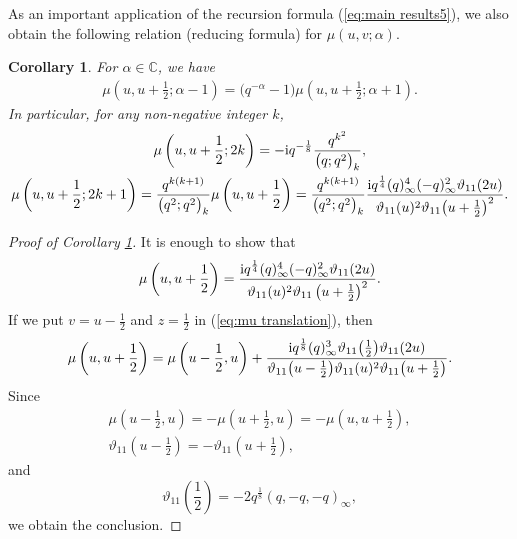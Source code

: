 \documentclass[pdftex]{sigma}
\numberwithin{equation}{section}
\newtheorem{cor}[thm]{Corollary}
\theoremstyle{definition}
\newcommand{\Cz}{\mathbb{C}}
\begin{document}
As an important application of the recursion formula (\ref{eq:main results5}), we also obtain the following relation (reducing formula) for $\mu(u,v;\alpha)$.
\begin{cor}
\label{cor:mu a reduction}
For $\alpha\in\Cz$, we have
\begin{gather}
\label{eq:mu a reduction}
\mu\left(u,u+\frac{1}{2};\alpha-1\right)=\big(q^{-\alpha}-1\big)\mu\left(u,u+\frac{1}{2};\alpha+1\right).
\end{gather}
In particular, for any non-negative integer $k$,
\begin{gather*}
\mu\left(u,u+\frac{1}{2};2k\right)
 =
 -{\rm i}q^{-\frac{1}{8}}\frac{q^{k^2}}{\big(q;q^2\big)_{k}}, \\
\mu\left(u,u+\frac{1}{2};2k+1\right)
 =
 \frac{q^{k(k+1)}}{\big(q^2;q^2\big)_{k}}\mu\left(u,u+\frac{1}{2}\right)
 =
 \frac{q^{k(k+1)}}{\big(q^2;q^2\big)_{k}}\frac{{\rm i}q^{\frac{1}{4}}(q)_{\infty }^{4}(-q)_{\infty }^{2}\vartheta_{11}(2u)}{\vartheta_{11}(u)^{2}\vartheta_{11}\big(u+\frac{1}{2}\big)^{2}}.
\end{gather*}
\end{cor}

\begin{proof}[Proof of Corollary \ref{cor:mu a reduction}]
It is enough to show that
\begin{gather*}
\mu\left(u,u+\frac{1}{2}\right)
 =
 \frac{{\rm i}q^{\frac{1}{4}}(q)_{\infty }^{4}(-q)_{\infty }^{2}\vartheta_{11}(2u)}{\vartheta_{11}(u)^{2}\vartheta_{11}\left(u+\frac{1}{2}\right)^{2}}.
\end{gather*}
If we put $v=u-\frac{1}{2}$ and $z=\frac{1}{2}$ in (\ref{eq:mu translation}), then
\begin{gather*}
\mu\left(u,u+\frac{1}{2}\right)
 =
 \mu\left(u-\frac{1}{2},u\right)
 +\frac{{\rm i}q^{\frac{1}{8}}(q)_{\infty }^{3}\vartheta_{11}\big(\frac{1}{2}\big)\vartheta_{11}(2u)}{\vartheta_{11}\big(u-\frac{1}{2}\big)\vartheta_{11}(u)^{2}\vartheta_{11}\big(u+\frac{1}{2}\big)}.
\end{gather*}
Since
\begin{gather*}
\mu\left(u-\frac{1}{2},u\right)
 =
 -\mu\left(u+\frac{1}{2},u\right)
 =-\mu\left(u,u+\frac{1}{2}\right), \\
\vartheta_{11}\left(u-\frac{1}{2}\right)
 =
 -\vartheta_{11}\left(u+\frac{1}{2}\right),
\end{gather*}
and
\[
\vartheta_{11}\left(\frac{1}{2}\right)
 =
 -2q^{\frac{1}{8}}(q,-q,-q)_{\infty },
\]
we obtain the conclusion.
\end{proof}
\end{document}
